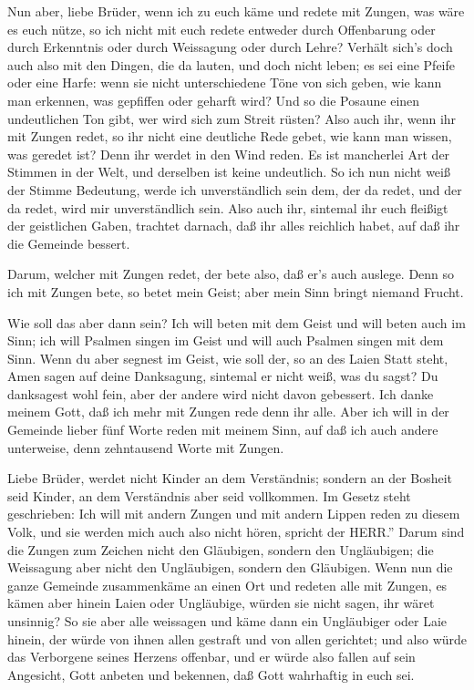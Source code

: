  Nun aber, liebe Brüder, wenn ich zu euch käme und redete
mit Zungen, was wäre es euch nütze, so ich nicht mit euch redete
entweder durch Offenbarung oder durch Erkenntnis oder durch Weissagung
oder durch Lehre?  Verhält sich's doch auch also mit den
Dingen, die da lauten, und doch nicht leben; es sei eine Pfeife oder
eine Harfe: wenn sie nicht unterschiedene Töne von sich geben, wie kann
man erkennen, was gepfiffen oder geharft wird?  Und so die
Posaune einen undeutlichen Ton gibt, wer wird sich zum Streit rüsten?
 Also auch ihr, wenn ihr mit Zungen redet, so ihr nicht eine
deutliche Rede gebet, wie kann man wissen, was geredet ist? Denn ihr
werdet in den Wind reden.  Es ist mancherlei Art der
Stimmen in der Welt, und derselben ist keine undeutlich. 
So ich nun nicht weiß der Stimme Bedeutung, werde ich unverständlich
sein dem, der da redet, und der da redet, wird mir unverständlich sein.
 Also auch ihr, sintemal ihr euch fleißigt der geistlichen
Gaben, trachtet darnach, daß ihr alles reichlich habet, auf daß ihr die
Gemeinde bessert.

 Darum, welcher mit Zungen redet, der bete also, daß er's
auch auslege.  Denn so ich mit Zungen bete, so betet mein
Geist; aber mein Sinn bringt niemand Frucht.

 Wie soll das aber dann sein? Ich will beten mit dem Geist
und will beten auch im Sinn; ich will Psalmen singen im Geist und will
auch Psalmen singen mit dem Sinn.  Wenn du aber segnest im
Geist, wie soll der, so an des Laien Statt steht, Amen sagen auf deine
Danksagung, sintemal er nicht weiß, was du sagst?  Du
danksagest wohl fein, aber der andere wird nicht davon gebessert.
 Ich danke meinem Gott, daß ich mehr mit Zungen rede denn
ihr alle.  Aber ich will in der Gemeinde lieber fünf Worte
reden mit meinem Sinn, auf daß ich auch andere unterweise, denn
zehntausend Worte mit Zungen.

 Liebe Brüder, werdet nicht Kinder an dem Verständnis;
sondern an der Bosheit seid Kinder, an dem Verständnis aber seid
vollkommen.  Im Gesetz steht geschrieben: Ich will mit
andern Zungen und mit andern Lippen reden zu diesem Volk, und sie werden
mich auch also nicht hören, spricht der HERR.''  Darum sind
die Zungen zum Zeichen nicht den Gläubigen, sondern den Ungläubigen; die
Weissagung aber nicht den Ungläubigen, sondern den Gläubigen.
 Wenn nun die ganze Gemeinde zusammenkäme an einen Ort und
redeten alle mit Zungen, es kämen aber hinein Laien oder Ungläubige,
würden sie nicht sagen, ihr wäret unsinnig?  So sie aber
alle weissagen und käme dann ein Ungläubiger oder Laie hinein, der würde
von ihnen allen gestraft und von allen gerichtet;  und also
würde das Verborgene seines Herzens offenbar, und er würde also fallen
auf sein Angesicht, Gott anbeten und bekennen, daß Gott wahrhaftig in
euch sei.

